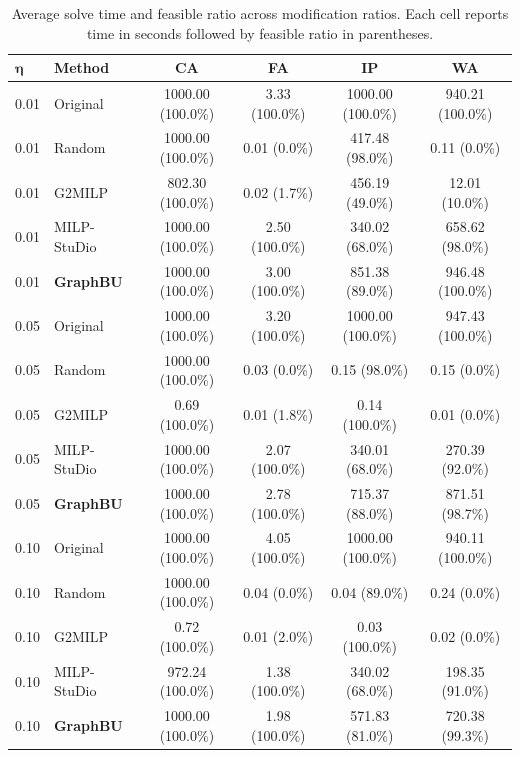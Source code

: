 \documentclass[letterpaper]{article}
\newcommand{\method}{\textbf{GraphBU}\xspace}
\begin{document}
\begin{table}[!t]
\vspace{6pt}
\footnotesize
\setlength{\tabcolsep}{3.5pt}
\renewcommand{\arraystretch}{0.96}
\caption{Average solve time and feasible ratio across modification ratios. Each cell reports time in seconds followed by feasible ratio in parentheses.}
\label{tab:app_solve}
\begin{tabular}{@{}llcccc@{}}
\toprule
$\boldsymbol{\eta}$ & \textbf{Method} & \textbf{CA} & \textbf{FA} & \textbf{IP} & \textbf{WA} \\
\midrule
0.01 & Original & 1000.00 (100.0\%) & 3.33 (100.0\%) & 1000.00 (100.0\%) & 940.21 (100.0\%) \\
0.01 & Random & 1000.00 (100.0\%) & 0.01 (0.0\%) & 417.48 (98.0\%) & 0.11 (0.0\%) \\
0.01 & G2MILP & 802.30 (100.0\%) & 0.02 (1.7\%) & 456.19 (49.0\%) & 12.01 (10.0\%) \\
0.01 & MILP-StuDio & 1000.00 (100.0\%) & 2.50 (100.0\%) & 340.02 (68.0\%) & 658.62 (98.0\%) \\
0.01 & \method & 1000.00 (100.0\%) & 3.00 (100.0\%) & 851.38 (89.0\%) & 946.48 (100.0\%) \\
\midrule
0.05 & Original & 1000.00 (100.0\%) & 3.20 (100.0\%) & 1000.00 (100.0\%) & 947.43 (100.0\%) \\
0.05 & Random & 1000.00 (100.0\%) & 0.03 (0.0\%) & 0.15 (98.0\%) & 0.15 (0.0\%) \\
0.05 & G2MILP & 0.69 (100.0\%) & 0.01 (1.8\%) & 0.14 (100.0\%) & 0.01 (0.0\%) \\
0.05 & MILP-StuDio & 1000.00 (100.0\%) & 2.07 (100.0\%) & 340.01 (68.0\%) & 270.39 (92.0\%) \\
0.05 & \method & 1000.00 (100.0\%) & 2.78 (100.0\%) & 715.37 (88.0\%) & 871.51 (98.7\%) \\
\midrule
0.10 & Original & 1000.00 (100.0\%) & 4.05 (100.0\%) & 1000.00 (100.0\%) & 940.11 (100.0\%) \\
0.10 & Random & 1000.00 (100.0\%) & 0.04 (0.0\%) & 0.04 (89.0\%) & 0.24 (0.0\%) \\
0.10 & G2MILP & 0.72 (100.0\%) & 0.01 (2.0\%) & 0.03 (100.0\%) & 0.02 (0.0\%) \\
0.10 & MILP-StuDio & 972.24 (100.0\%) & 1.38 (100.0\%) & 340.02 (68.0\%) & 198.35 (91.0\%) \\
0.10 & \method & 1000.00 (100.0\%) & 1.98 (100.0\%) & 571.83 (81.0\%) & 720.38 (99.3\%) \\
\bottomrule
\end{tabular}
\end{table}
\end{document}
